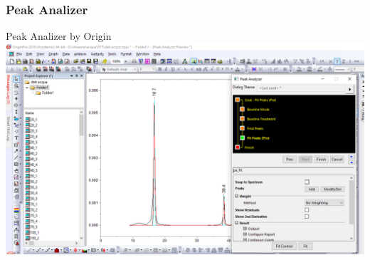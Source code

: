 \documentclass[xcolor=table]{beamer}
\begin{document}
\begin{frame}
\frametitle{Peak Analizer}

\fontsize{10}{10.2} \selectfont
Peak Analizer by Origin
\includegraphics[width=.9\columnwidth]{peak_analizer.PNG}

\end{frame}
\end{document}
